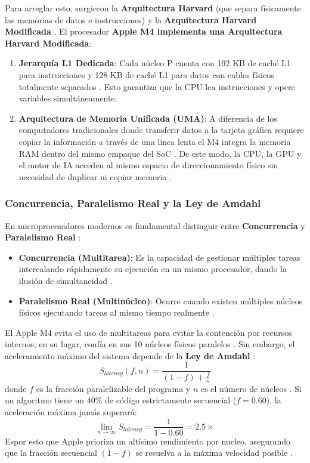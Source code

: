\documentclass[12pt,a4paper]{article}
\begin{document}
Para arreglar esto, surgieron la \textbf{Arquitectura Harvard} (que separa físicamente las memorias de datos e instrucciones) y la \textbf{Arquitectura Harvard Modificada} \cite{patterson}. El procesador \textbf{Apple M4 implementa una Arquitectura Harvard Modificada}:
\begin{enumerate}[leftmargin=*]
    \item \textbf{Jerarquía L1 Dedicada}: Cada núcleo P cuenta con 192 KB de caché L1 para instrucciones y 128 KB de caché L1 para datos con cables físicos totalmente separados \cite{apple_m4}. Esto garantiza que la CPU lea instrucciones y opere variables simultáneamente.
    \item \textbf{Arquitectura de Memoria Unificada (UMA)}: A diferencia de los computadores tradicionales donde transferir datos a la tarjeta gráfica requiere copiar la información a través de una linea lenta el M4 integra la memoria RAM dentro del mismo empaque del SoC \cite{apple_m4}. De este modo, la CPU, la GPU y el motor de IA acceden al mismo espacio de direccionamiento físico sin necesidad de duplicar ni copiar memoria \cite{apple_m4}.
\end{enumerate}

\subsubsection{Concurrencia, Paralelismo Real y la Ley de Amdahl}
En microprocesadores modernos es fundamental distinguir entre \textbf{Concurrencia} y \textbf{Paralelismo Real} \cite{patterson}:
\begin{itemize}[leftmargin=*]
    \item \textbf{Concurrencia (Multitarea)}: Es la capacidad de gestionar múltiples tareas intercalando rápidamente su ejecución en un mismo procesador, dando la ilusión de simultaneidad \cite{patterson}.
    \item \textbf{Paralelismo Real (Multinúcleo)}: Ocurre cuando existen múltiples núcleos físicos ejecutando tareas al mismo tiempo realmente \cite{patterson}.
\end{itemize}

El Apple M4 evita el uso de multitareas para evitar la contención por recursos internos; en su lugar, confía en sus 10 núcleos físicos paralelos \cite{apple_m4}. Sin embargo, el aceleramiento máximo del sistema depende de la \textbf{Ley de Amdahl} \cite{amdahl}:
$$S_{latency}(f, n) = \frac{1}{(1 - f) + \frac{f}{n}}$$
donde $f$ es la fracción paralelizable del programa y $n$ es el número de núcleos \cite{amdahl}. Si un algoritmo  tiene un $40\%$ de código estrictamente secuencial ($f = 0.60$), la aceleración máxima jamás superará:
$$\lim_{n \to \infty} S_{latency} = \frac{1}{1 - 0.60} = 2.5\times$$
Espor esto que Apple prioriza un altísimo rendimiento por nucleo, asegurando que la fracción secuencial $(1-f)$ se resuelva a la máxima velocidad posible \cite{apple_m4, amdahl}.
\end{document}
